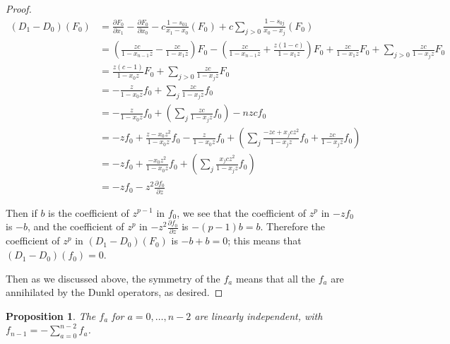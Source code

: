 \documentclass{article}
\numberwithin{equation}{section}
\newtheorem{proposition}[equation]{Proposition}
\begin{document}
\begin{proof}
\begin{align*}
(D_1-D_0)(F_0)&=\frac{\partial F_0}{\partial x_1}-\frac{\partial F_0}{\partial x_0}-c\frac{1-s_{01}}{x_1-x_0}(F_0)+c\sum_{j>0}\frac{1-s_{0j}}{x_0-x_j}(F_0)\\
&=\left(\frac{zc}{1-x_{n-1}z}-\frac{zc}{1-x_1z}\right)F_0-\left(\frac{zc}{1-x_{n-1}z}+\frac{z(1-c)}{1-x_1z}\right)F_0+\frac{zc}{1-x_1z}F_0+\sum_{j>0}\frac{zc}{1-x_jz}F_0\\
&=\frac{z(c-1)}{1-x_0z}F_0+\sum_{j>0}\frac{zc}{1-x_jz}F_0\\
&=-\frac{z}{1-x_0z}f_0+\sum_{j} \frac{zc}{1-x_jz}f_0\\
&=-\frac{z}{1-x_0z}f_0+\left(\sum_{j} \frac{zc}{1-x_jz}f_0\right)-nzcf_0\\
&=-zf_0+\frac{z-x_0z^2}{1-x_0z}f_0-\frac{z}{1-x_0z}f_0+\left(\sum_{j} \frac{-zc+x_jcz^2}{1-x_jz}f_0+\frac{zc}{1-x_jz}f_0\right)\\
&=-zf_0+\frac{-x_0z^2}{1-x_0z}f_0+\left(\sum_{j} \frac{x_jcz^2}{1-x_jz}f_0\right)\\
&=-zf_0-z^2\frac{\partial f_0}{\partial z}
\end{align*}

Then if $b$ is the coefficient of $z^{p-1}$ in $f_0$, we see that the coefficient of $z^p$ in $-zf_0$ is $-b$, and the coefficient of $z^p$ in $-z^2\frac{\partial f_0}{\partial z}$ is $-(p-1)b=b$. Therefore the coefficient of $z^p$ in $(D_1-D_0)(F_0)$ is $-b+b=0$; this means that $(D_1-D_0)(f_0)=0$. 

Then as we discussed above, the symmetry of the $f_a$ means that all the $f_a$ are annihilated by the Dunkl operators, as desired.

\end{proof}

\begin{proposition} The $f_a$ for $a=0,\dots,n-2$ are linearly independent, with $f_{n-1}=-\sum_{a=0}^{n-2} f_a$. 
\end{proposition} 
\end{document}
